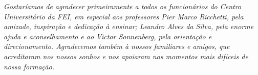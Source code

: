 \documentclass[../../layout.tex]{subfiles}
\begin{document}
\begin{dedicatoria}
\vspace*{\fill}

\noindent
\begin{flushright} 
\begin{minipage}{0.5\textwidth}
\textit{Gostaríamos de agradecer primeiramente a todos os funcionários do Centro Universitário da FEI, em especial aos professores Pier Marco Ricchetti, pela amizade, inspiração e dedicação à ensinar; Leandro Alves da Silva, pela enorme ajuda e aconselhamento e ao  Victor Sonnenberg, pela orientação e direcionamento. Agradecemos também à nossos familiares e amigos, que acreditaram nos nossos sonhos e nos apoiaram nos momentos mais difíceis de nossa formação.}
\end{minipage}
\end{flushright}

\end{dedicatoria}
\end{document}
